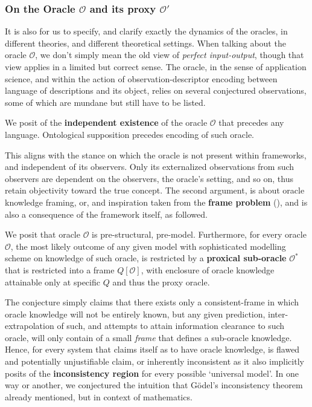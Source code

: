 \subsubsection{On the Oracle $\mathcal{O}$ and its proxy $\mathcal{O}'$}

It is also for us to specify, and clarify exactly the dynamics of the oracles, in different theories, and different theoretical settings. When talking about the oracle $\mathcal{O}$, we don't simply mean the old view of \textit{perfect input-output}, though that view applies in a limited but correct sense. The oracle, in the sense of application science, and within the action of observation-descriptor encoding between language of descriptions and its object, relies on several conjectured observations, some of which are mundane but still have to be listed. 
\begin{conjecture}[Existence]
	We posit of the \textbf{independent existence} of the oracle $\mathcal{O}$ that precedes any language. Ontological supposition precedes encoding of such oracle. 
\end{conjecture}
This aligns with the stance on which the oracle is not present within frameworks, and independent of its observers. Only its externalized observations from such observers are dependent on the observers, the oracle's setting, and so on, thus retain objectivity toward the true concept. The second argument, is about oracle knowledge framing, or, and inspiration taken from the \textbf{frame problem} (\cite{sep-frame-problem,FrameGryzJarek,SeagerFrameAxiological,Briggs2014MachineE,DreyfusImpasse1979}), and is also a consequence of the framework itself, as followed. 
\begin{conjecture}
	We posit that oracle $\mathcal{O}$ is pre-structural, pre-model. Furthermore, for every oracle $\mathcal{O}$, the most likely outcome of any given model with sophisticated modelling scheme on knowledge of such oracle, is restricted by a \textbf{proxical sub-oracle} $\mathcal{O}^{*}$ that is restricted into a frame $Q[\mathcal{O}]$, with enclosure of oracle knowledge attainable only at specific $Q$ and thus the proxy oracle. 
\end{conjecture}
The conjecture simply claims that there exists only a consistent-frame in which oracle knowledge will not be entirely known, but any given prediction, inter-extrapolation of such, and attempts to attain information clearance to such oracle, will only contain of a small \textit{frame} that defines a sub-oracle knowledge. Hence, for every system that claims itself as to have oracle knowledge, is flawed and potentially unjustifiable claim, or inherently inconsistent as it also implicitly posits of the \textbf{inconsistency region} for every possible `universal model'. In one way or another, we conjectured the intuition that Gödel's inconsistency theorem already mentioned, but in context of mathematics. 

